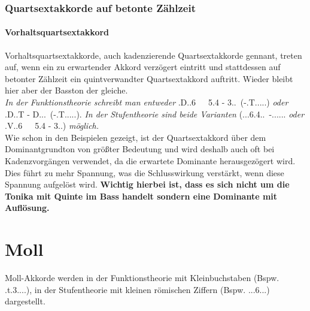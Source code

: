 \documentclass[a4paper]{article}
\newcommand{\dS}[1]{\HH.\uppercase\expandafter{\romannumeral #1\relax}.....} %
\newcommand{\dSQS}[1]{\HH.\uppercase\expandafter{\romannumeral #1\relax}..6.4..} %
\newcommand{\mSS}[1]{\HH.\romannumeral #1..6...} %
\newcommand{\T}{\HH.T.....}
\newcommand{\TSm}{\HH.t.3....}
\begin{document}
	\subsubsection{Quartsextakkorde auf betonte Zählzeit}
	\paragraph{Vorhaltsquartsextakkord}
	Vorhaltsquartsextakkorde, auch kadenzierende Quartsextakkorde gennant, treten auf, wenn ein zu erwartender Akkord verzögert eintritt und stattdessen auf betonter Zählzeit ein quintverwandter Quartsextakkord auftritt. Wieder bleibt hier aber der Basston der gleiche.\\
	\textit{In der Funktionstheorie schreibt man entweder} \HH.D..6\ \ \ 5.4 - 3..\ (-\T) \textit{oder} \HH.D..T - D...\ (-\T). \textit{In der Stufentheorie sind beide Varianten} (\dSQS{1}\ -\dS{5} \textit{oder} \HH.V..6\ \ \ 5.4 - 3..) \textit{möglich.}\\
	Wie schon in den Beispielen gezeigt, ist der Quartsextakkord über dem Dominantgrundton von größter Bedeutung und wird deshalb auch oft bei Kadenzvorgängen verwendet, da die erwartete Dominante herausgezögert wird. Dies führt zu mehr Spannung, was die Schlusswirkung verstärkt, wenn diese Spannung aufgelöst wird. \textbf{Wichtig hierbei ist, dass es sich nicht um die Tonika mit Quinte im Bass handelt sondern eine Dominante mit Auflösung.}
	
	\section{Moll}
	Moll-Akkorde werden in der Funktionstheorie mit Kleinbuchstaben (Bspw. \TSm), in der Stufentheorie mit kleinen römischen Ziffern (Bspw. \mSS{1}) dargestellt.
\end{document}
